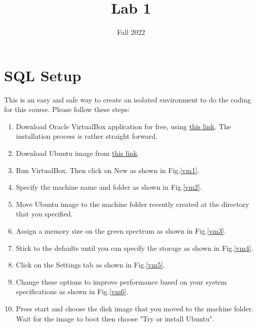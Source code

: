 \documentclass{homework}
\author{}
\date{Fall 2022}
\title{Lab 1}
\begin{document}
 \maketitle

\section{SQL Setup}
This is an easy and safe way to create an isolated environment to do the coding for this course. Please follow these steps:
\begin{enumerate}
    \item Download Oracle VirtualBox application for free, using \href{https://www.virtualbox.org/wiki/Downloads}{this link}.
    The installation process is rather straight forward.
    
    \item Download Ubuntu image from \href{https://ubuntu.com/download/desktop}{this link}.
    
    \item Run VirtualBox. Then click on New as shown in Fig.\ref{vm1}.
    
    \item Specify the machine name and folder as shown in Fig.\ref{vm2}.

    \item Move Ubuntu image to the machine folder recently created at the directory that you specified.
    \item Assign a memory size on the green spectrum as shown in Fig.\ref{vm3}.
    
    \item Stick to the defaults until you can specify the storage as shown in Fig.\ref{vm4}.
    
    \item Click on the Settings tab as shown in Fig.\ref{vm5}.
    
    \item Change these options to improve performance based on your system specifications as shown in Fig.\ref{vm6}.
    
    \item Press start and choose the disk image that you moved to the machine folder. Wait for the image to boot then choose "Try or install Ubuntu".
    

\end{enumerate}
\end{document}
